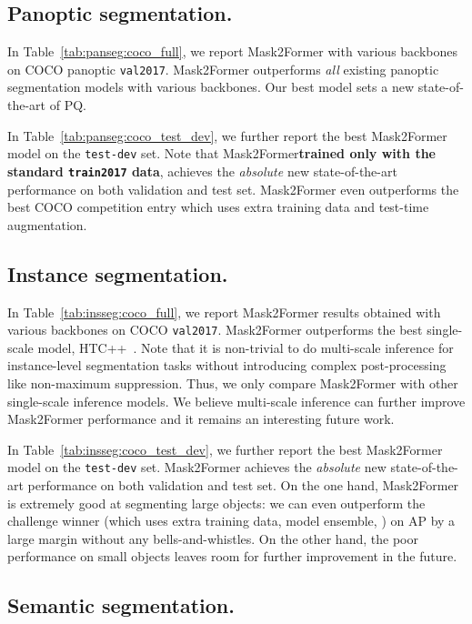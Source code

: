 \documentclass[10pt,twocolumn,letterpaper]{article}
\newcommand{\modelname}{Mask2Former\xspace}
\newcommand{\tabref}[1]{Table~\ref{#1}}
\begin{document}
\subsection{Panoptic segmentation.}
\label{app:results:panoptic}

In \tabref{tab:panseg:coco_full}, we report \modelname with various backbones on COCO panoptic \texttt{val2017}. \modelname outperforms \emph{all} existing panoptic segmentation models with various backbones. Our best model sets a new state-of-the-art of  PQ.

In \tabref{tab:panseg:coco_test_dev}, we further report the best \modelname model on the \texttt{test-dev} set. Note that \modelname \textbf{trained only with the standard \texttt{train2017} data}, achieves the \emph{absolute} new state-of-the-art performance on both validation and test set. \modelname even outperforms the best COCO competition entry which uses extra training data and test-time augmentation.

\subsection{Instance segmentation.}
\label{app:results:instance}

In \tabref{tab:insseg:coco_full}, we report \modelname results obtained with various backbones on COCO \texttt{val2017}. \modelname outperforms the best single-scale model, HTC++~\cite{liu2021swin,chen2019hybrid}. Note that it is non-trivial to do multi-scale inference for instance-level segmentation tasks without introducing complex post-processing like non-maximum suppression. Thus, we only compare \modelname with other  single-scale inference models. We believe multi-scale inference can further improve \modelname performance and it remains an interesting future work.

In \tabref{tab:insseg:coco_test_dev}, we further report the best \modelname model on the \texttt{test-dev} set. \modelname achieves the \emph{absolute} new state-of-the-art performance on both validation and test set. On the one hand, \modelname is extremely good at segmenting large objects: we can even outperform the challenge winner (which uses extra training data, model ensemble, \etc) on AP by a large margin without any bells-and-whistles. On the other hand, the poor performance on small objects leaves room for further improvement in the future.

\subsection{Semantic segmentation.}
\label{app:results:semantic}
\end{document}
